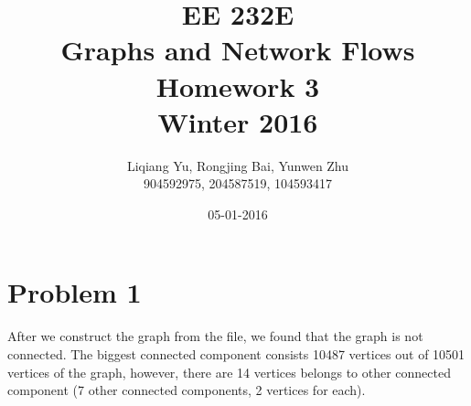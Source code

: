 \documentclass{article}
\begin{document}
\begin{titlepage}
\title{EE 232E \\Graphs and Network Flows\\Homework 3\\Winter 2016} 
\author{Liqiang Yu, Rongjing Bai, Yunwen Zhu\\
904592975, 204587519, 104593417}  %
\date{05-01-2016}
\end{titlepage}
\maketitle
\newpage
\tableofcontents
\newpage
\section{Problem 1}
After we construct the graph from the file, we found that the graph is not connected. The biggest connected component consists 10487 vertices out of 10501 vertices of the graph, however, there are 14 vertices  belongs to other connected component (7 other connected components, 2 vertices for each).
\end{document}

